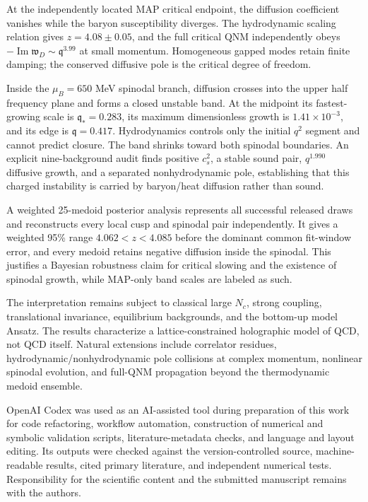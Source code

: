 \documentclass[11pt,a4paper]{article}
\newcommand{\mub}{\mu_B}
\newcommand{\w}{\mathfrak{w}}
\newcommand{\q}{\mathfrak{q}}
\begin{document}
At the independently located MAP critical endpoint, the diffusion coefficient
vanishes while the baryon susceptibility diverges.  The hydrodynamic scaling
relation gives $z=4.08\pm0.05$, and the full critical QNM independently obeys
$-\operatorname{Im}\w_D\sim\q^{3.99}$ at small momentum.  Homogeneous gapped
modes retain finite damping; the conserved diffusive pole is the critical
degree of freedom.

Inside the $\mub=650$ MeV spinodal branch, diffusion crosses into the upper
half frequency plane and forms a closed unstable band.  At the midpoint its
fastest-growing scale is $\q_*=0.283$, its maximum dimensionless growth is
$1.41\times10^{-3}$, and its edge is $\q=0.417$.  Hydrodynamics controls only
the initial $q^2$ segment and cannot predict closure.  The band shrinks toward
both spinodal boundaries.  An explicit nine-background audit finds positive
$c_s^2$, a stable sound pair, $q^{1.990}$ diffusive growth, and a separated
nonhydrodynamic pole, establishing that this charged instability is carried
by baryon/heat diffusion rather than sound.

A weighted 25-medoid posterior analysis represents all successful released
draws and reconstructs every local cusp and spinodal pair independently.  It
gives a weighted 95\% range $4.062<z<4.085$ before the dominant common
fit-window error, and every medoid retains negative diffusion inside the
spinodal.  This justifies a Bayesian robustness claim for critical slowing
and the existence of spinodal growth, while MAP-only band scales are labeled
as such.

The interpretation remains subject to classical large $N_c$, strong coupling,
translational invariance, equilibrium backgrounds, and the bottom-up model
Ansatz.  The results characterize a lattice-constrained holographic model of
QCD, not QCD itself.  Natural extensions include correlator residues,
hydrodynamic/nonhydrodynamic pole collisions at complex momentum, nonlinear
spinodal evolution, and full-QNM propagation beyond the thermodynamic medoid
ensemble.

\acknowledgments
OpenAI Codex was used as an AI-assisted tool during preparation of this work
for code refactoring, workflow automation, construction of numerical and
symbolic validation scripts, literature-metadata checks, and language and
layout editing.  Its outputs were checked against the version-controlled
source, machine-readable results, cited primary literature, and independent
numerical tests.  Responsibility for the scientific content and the submitted
manuscript remains with the authors.
\end{document}

